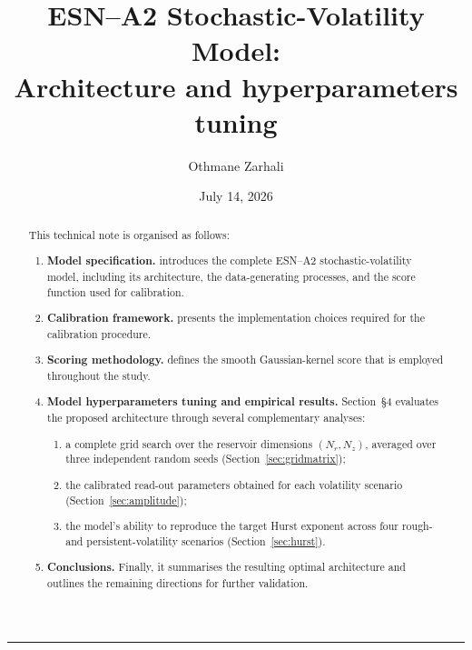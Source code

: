 \documentclass[11pt,a4paper]{article}
\title{ESN--A2 Stochastic-Volatility Model:\\
Architecture and hyperparameters tuning}
\author{Othmane Zarhali}
\date{July 14, 2026}
\begin{document}
\maketitle
\vspace{-0.3cm}
\noindent\rule{\textwidth}{0.8pt}

\begin{abstract}

This technical note is organised as follows:\\

\begin{enumerate}
    \item \textbf{Model specification.} introduces the complete ESN--A2 stochastic-volatility model, including its architecture, the data-generating processes, and the score function used for calibration.

    \item \textbf{Calibration framework.} presents the implementation choices required for the calibration procedure.

    \item \textbf{Scoring methodology.} defines the smooth Gaussian-kernel score that is employed throughout the study.

    \item \textbf{Model hyperparameters tuning and empirical results.} Section~\S4 evaluates the proposed architecture through several complementary analyses:
    \begin{enumerate}
        \item a complete grid search over the reservoir dimensions $(N_r,N_z)$, averaged over three independent random seeds (Section~\ref{sec:gridmatrix});
        \item the calibrated read-out parameters obtained for each volatility scenario (Section~\ref{sec:amplitude});
        \item the model's ability to reproduce the target Hurst exponent across four rough- and persistent-volatility scenarios (Section~\ref{sec:hurst}).
    \end{enumerate}

    \item \textbf{Conclusions.} Finally, it summarises the resulting optimal architecture and outlines the remaining directions for further validation.
\end{enumerate}
\end{abstract}

\tableofcontents
\vspace{0.4cm}
\end{document}
